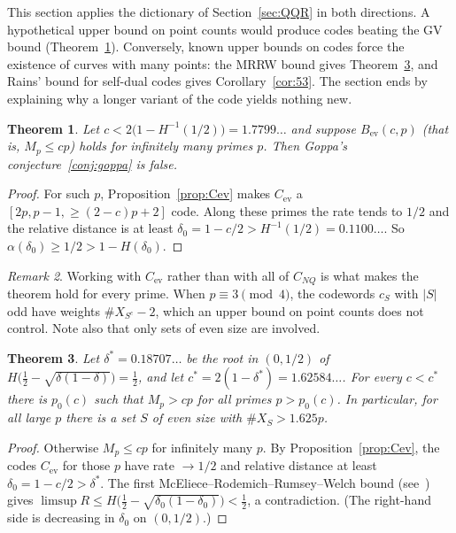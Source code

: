 \documentclass[12pt,letterpaper]{article}
\newtheorem{theorem}{Theorem}[section]
\theoremstyle{definition}
\theoremstyle{remark}
\newtheorem{remark}[theorem]{Remark}
\numberwithin{equation}{section}
\newcommand{\CNQ}{C_{NQ}}
\newcommand{\Cev}{C_{\mathrm{ev}}}
\newcommand{\X}{\#X}
\begin{document}
This section applies the dictionary of Section~\ref{sec:QQR} in both directions.
A hypothetical upper bound on point counts would produce codes beating the GV
bound (Theorem~\ref{thm:goppa}). Conversely, known upper bounds on codes force the
existence of curves with many points: the MRRW bound gives Theorem~\ref{thm:mrrw},
and Rains' bound for self-dual codes gives Corollary~\ref{cor:53}. The section ends
by explaining why a longer variant of the code yields nothing new.

\begin{theorem}\label{thm:goppa}
Let $c<2\big(1-H^{-1}(1/2)\big)=1.7799\ldots$ and suppose $B_{\mathrm{ev}}(c,p)$
(that is, $M_p\le cp$) holds for infinitely many primes $p$. Then Goppa's
conjecture~\ref{conj:goppa} is false.
\end{theorem}

\begin{proof}
For such $p$, Proposition~\ref{prop:Cev} makes $\Cev$ a $[2p,p-1,\ge(2-c)p+2]$ code.
Along these primes the rate tends to $1/2$ and the relative distance is at least
$\delta_0=1-c/2>H^{-1}(1/2)=0.1100\ldots$. So $\alpha(\delta_0)\ge1/2>1-H(\delta_0)$.
\end{proof}

\begin{remark}
Working with $\Cev$ rather than with all of $\CNQ$ is what makes the theorem hold
for every prime. When $p\equiv3\pmod 4$, the codewords $c_S$ with $|S|$ odd have
weights $\X_{S^c}-2$, which an upper bound on point counts does not control. Note
also that only sets of even size are involved.
\end{remark}

\begin{theorem}\label{thm:mrrw}
Let $\delta^*=0.18707\ldots$ be the root in $(0,1/2)$ of
$H\big(\tfrac12-\sqrt{\delta(1-\delta)}\big)=\tfrac12$, and let
$c^*=2(1-\delta^*)=1.62584\ldots$. For every $c<c^*$ there is $p_0(c)$ such that
$M_p>cp$ for all primes $p>p_0(c)$. In particular, for all large $p$ there is a set
$S$ of even size with $\X_S>1.625p$.
\end{theorem}

\begin{proof}
Otherwise $M_p\le cp$ for infinitely many $p$. By Proposition~\ref{prop:Cev}, the
codes $\Cev$ for those $p$ have rate $\to1/2$ and relative distance at least
$\delta_0=1-c/2>\delta^*$. The first McEliece--Rodemich--Rumsey--Welch bound
\cite{MRRW77} (see~\cite[Thm.~2.10.6]{HP03}) gives
$\limsup R\le H\big(\tfrac12-\sqrt{\delta_0(1-\delta_0)}\big)<\tfrac12$, a
contradiction. (The right-hand side is decreasing in $\delta_0$ on $(0,1/2)$.)
\end{proof}
\end{document}
